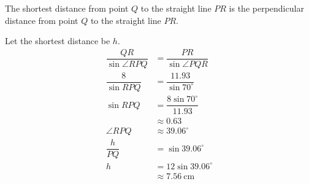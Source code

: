 \documentclass{report}
\begin{document}
\begin{enumerate}[leftmargin=*]
\begin{enumerate}
                    The shortest distance from point $Q$ to the straight line $PR$ is the
                    perpendicular distance from point $Q$ to the straight line $PR$.

                    Let the shortest distance be $h$.
                    \begin{align*}
                        \dfrac{QR}{\sin \angle RPQ} & = \dfrac{PR}{\sin \angle PQR}      \\
                        \dfrac{8}{\sin RPQ}         & = \dfrac{11.93}{\sin 70^{\circ}}   \\
                        \sin RPQ                    & = \dfrac{8 \sin 70^{\circ}}{11.93} \\
                                                    & \approx 0.63                       \\
                        \angle RPQ                  & \approx 39.06^{\circ}              \\
                        \dfrac{h}{PQ}               & = \sin 39.06^{\circ}               \\
                        h                           & = 12 \sin 39.06^{\circ}            \\
                                                    & \approx 7.56 \mathrm{~cm}
                    \end{align*}
          \end{enumerate}
\end{enumerate}
\end{document}
